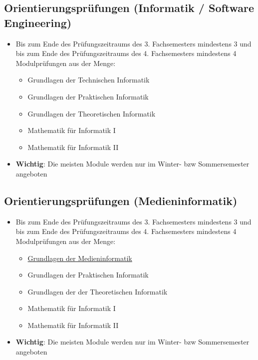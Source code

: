 \documentclass[
	aspectratio=169, 
	10pt 
]{beamer}
\begin{document}
\subsection{Orientierungsprüfungen (Informatik / Software Engineering)}
\begin{frame}{\insertsubsection \footnotemark[1]}
    \begin{itemize}
        \item Bis zum Ende des Prüfungszeitraums des 3. Fachsemesters mindestens 3 und bis zum Ende des Prüfungszeitraums des 4. Fachsemesters mindestens 4 Modulprüfungen aus der Menge: \begin{itemize}
        \item Grundlagen der Technischen Informatik
        \item Grundlagen der Praktischen Informatik
        \item Grundlagen der Theoretischen Informatik
        \item Mathematik für Informatik I
        \item Mathematik für Informatik II \end{itemize}
        \item \textbf{Wichtig}: Die meisten Module werden nur im Winter- bzw Sommersemester angeboten
    \end{itemize}

\end{frame}

\subsection{Orientierungsprüfungen (Medieninformatik)}
\begin{frame}{\insertsubsection \footnotemark[1]}
    \begin{itemize}
        \item Bis zum Ende des Prüfungszeitraums des 3. Fachsemesters mindestens 3 und bis zum Ende des Prüfungszeitraums des 4. Fachsemesters mindestens 4 Modulprüfungen aus der Menge: \begin{itemize}
        \item \underline{Grundlagen der Medieninformatik}
        \item Grundlagen der Praktischen Informatik
        \item Grundlagen der der Theoretischen Informatik
        \item Mathematik für Informatik I
        \item Mathematik für Informatik II \end{itemize}
        \item \textbf{Wichtig}: Die meisten Module werden nur im Winter- bzw Sommersemester angeboten
    \end{itemize}

\end{frame}
\end{document}
